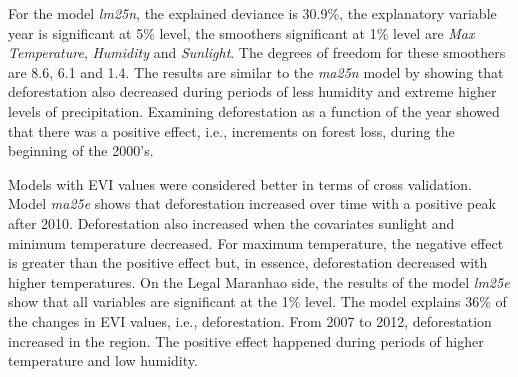 For the model \textit{lm25n}, the explained deviance is 30.9\%, the explanatory variable year is significant at 5\% level, the smoothers significant at 1\% level are \textit{Max Temperature}, \textit{Humidity} and \textit{Sunlight}. The degrees of freedom for these smoothers are 8.6, 6.1 and 1.4. The results are similar to the \textit{ma25n} model by showing that deforestation also decreased during periods of less humidity and extreme higher levels of precipitation. Examining deforestation as a function of the year showed that there was a positive effect, i.e., increments on forest loss, during the beginning of the 2000's.



Models with EVI values were considered better in terms of cross validation. Model \textit{ma25e} shows that deforestation increased over time with a positive peak after 2010. Deforestation also increased when the covariates sunlight and minimum temperature decreased. For maximum temperature, the negative effect is greater than the positive effect but, in essence, deforestation decreased with higher temperatures. On the Legal Maranhao side, the results of the model \textit{lm25e} show that all variables are significant at the 1\% level. The model explains 36\% of the changes in EVI values, i.e., deforestation. From 2007 to 2012, deforestation increased in the region. The positive effect happened during periods of higher temperature and low humidity. 






